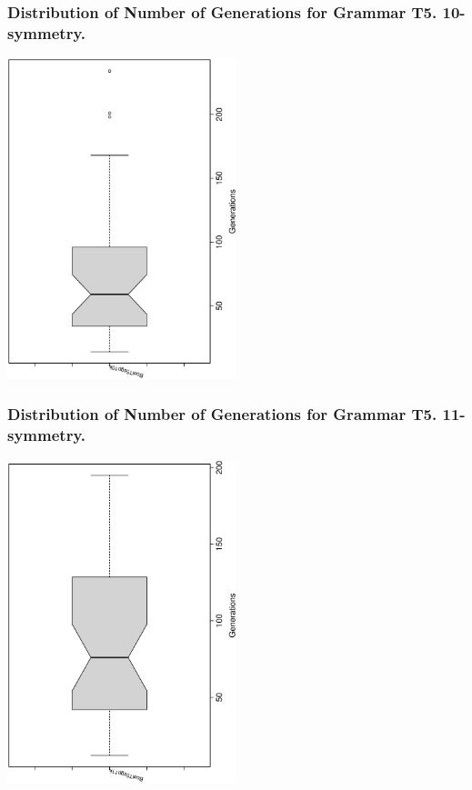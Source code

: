 \documentclass[18pt,c]{beamer}
\begin{document}
 \begin{frame}
 \frametitle{ Distribution of Number of Generations for Grammar T5. 10-symmetry. }
 \begin{center}
\includegraphics[width=0.5\textwidth, angle=-90]
{ExpFboxplottGenerations008.eps}
 \end{center}
 \label{ExpFboxplottGenerations008.eps}  
 \end{frame}

 \begin{frame}
 \frametitle{ Distribution of Number of Generations for Grammar T5. 11-symmetry. }
 \begin{center}
\includegraphics[width=0.5\textwidth, angle=-90]
{ExpFboxplottGenerations009.eps}
 \end{center}
 \label{ExpFboxplottGenerations009.eps}  
 \end{frame}
\end{document}
